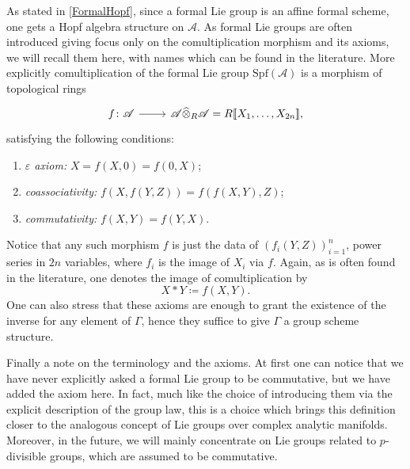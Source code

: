\begin{rem}[]
	As stated in \cref{FormalHopf}, since a formal Lie group
	is an affine formal scheme, one gets a Hopf algebra structure
	on $\mathscr{A}$.
	As formal Lie groups are often introduced giving focus only
	on the comultiplication morphism and its axioms, we will
	recall them here, with names which can be found in the literature.
	More explicitly comultiplication of the formal Lie group
	$\mathrm{Spf}(\mathscr{A})$ is a morphism of topological rings
	\begin{equation*}
	\begin{tikzcd}[row sep = 0ex
		,/tikz/column 1/.append style={anchor=base east}
		,/tikz/column 2/.append style={anchor=base west}]
		f\colon \mathscr{A} \arrow[r, "", rightarrow] &
		\mathscr{A} \widehat{\otimes}_R \mathscr{A} =
		R [\![ X_1, \ldots, X_{ 2n } ]\!]
	,\end{tikzcd}
	\end{equation*} 
	satisfying the following conditions:
	\begin{enumerate}
		\item {\em $\varepsilon$ axiom:} $X = f(X,0) = f(0,X)$;
		\item {\em coassociativity:} $f(X, f(Y,Z)) = f(f(X,Y), Z)$;
		\item {\em commutativity:} $f(X,Y) = f(Y,X)$.
	\end{enumerate}
	Notice that any such morphism $f$ is just the data of 
	$\left( f_i(Y,Z) \right)_{i=1}^n$, power series in $2n$ variables, where
	$f_i$ is the image of $X_i$ via $f$.
	Again, as is often found in the literature, one denotes the image of
	comultiplication by
	\begin{equation*}
		X \ast Y \coloneqq f(X,Y)
	.\end{equation*} 
	One can also stress that these axioms are enough to grant
	the existence of the inverse for any element of $\Gamma$,
	hence they suffice to give $\Gamma$ a group scheme structure.

	Finally a note on the terminology and the axioms.
	At first one can notice that we have never explicitly asked 
	a formal Lie group to be commutative, but we have added the axiom here.
	In fact, much like the choice of introducing them via the explicit description
	of the group law, this is a choice which brings this definition
	closer to the analogous concept of Lie groups over complex analytic manifolds.
	Moreover, in the future, we will mainly concentrate on Lie groups related to
	$p$-divisible groups, which are assumed to be commutative.
\end{rem}


